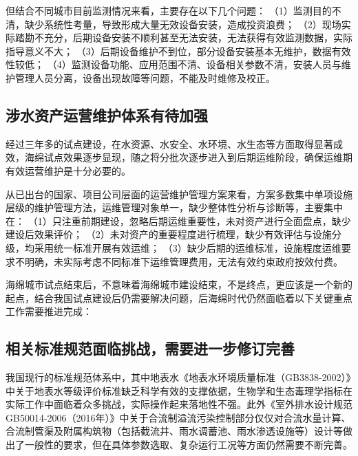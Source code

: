 \documentclass[]{book}
\begin{document}
但结合不同城市目前监测情况来看，主要存在以下几个问题：
（1）监测目的不清，缺少系统性考量，导致形成大量无效设备安装，造成投资浪费；
（2）现场实际踏勘不充分，后期设备安装不顺利甚至无法安装，无法获得有效监测数据，实际指导意义不大；
（3）后期设备维护不到位，部分设备安装基本无维护，数据有效性较低；
（4）监测设备功能、应用范围不清、设备相关参数不清，安装人员与维护管理人员分离，设备出现故障等问题，不能及时维修及校正。

\hypertarget{ux6d89ux6c34ux8d44ux4ea7ux8fd0ux8425ux7ef4ux62a4ux4f53ux7cfbux6709ux5f85ux52a0ux5f3a}{%
\subsection{涉水资产运营维护体系有待加强}\label{ux6d89ux6c34ux8d44ux4ea7ux8fd0ux8425ux7ef4ux62a4ux4f53ux7cfbux6709ux5f85ux52a0ux5f3a}}

经过三年多的试点建设，在水资源、水安全、水环境、水生态等方面取得显著成效，海绵试点效果逐步显现，随之将分批次逐步进入到后期运维阶段，确保运维期有效运营维护是十分必要的。

从已出台的国家、项目公司层面的运营维护管理方案来看，方案多数集中单项设施层级的维护管理方法，运维管理对象单一，缺少整体性分析与诊断等，主要集中在：
（1）只注重前期建设，忽略后期运维重要性，未对资产进行全面盘点，缺少建设后效果评价；
（2）未对资产的重要程度进行梳理，缺少有效评估与设施分级，均采用统一标准开展有效运维；
（3）缺少后期的运维标准，设施程度运维要求不明确，未实际考虑不同标准下运维管理费用，无法有效约束政府按效付费。

海绵城市试点结束后，不意味着海绵城市建设结束，不是终点，更应该是一个新的起点，结合我国试点建设后仍需要解决问题，后海绵时代仍然面临着以下关键重点工作需要推进完成：

\hypertarget{ux76f8ux5173ux6807ux51c6ux89c4ux8303ux9762ux4e34ux6311ux6218ux9700ux8981ux8fdbux4e00ux6b65ux4feeux8ba2ux5b8cux5584}{%
\subsection{相关标准规范面临挑战，需要进一步修订完善}\label{ux76f8ux5173ux6807ux51c6ux89c4ux8303ux9762ux4e34ux6311ux6218ux9700ux8981ux8fdbux4e00ux6b65ux4feeux8ba2ux5b8cux5584}}

我国现行的标准规范体系中，其中地表水《地表水环境质量标准（GB3838-2002）》中关于地表水等级评价标准缺乏科学有效的支撑依据，生物学和生态毒理学指标在实际工作中面临着众多挑战，实际操作起来落地性不强。此外《室外排水设计规范GB50014-2006（2016年）》中关于合流制溢流污染控制部分仅仅对合流水量计算、合流制管渠及附属构筑物（包括截流井、雨水调蓄池、雨水渗透设施等）设计等做出了一般性的要求，但在具体参数选取、复杂运行工况等方面仍然需要不断完善。
\end{document}
